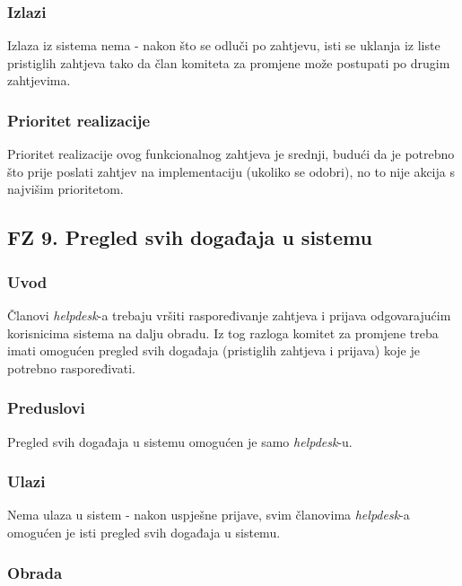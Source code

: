 \documentclass[12pt,a4paper]{article}
\begin{document}
\subsubsection{Izlazi}

Izlaza iz sistema nema - nakon što se odluči po zahtjevu, isti se uklanja iz liste pristiglih zahtjeva tako da član komiteta za promjene može postupati po drugim zahtjevima.

\subsubsection{Prioritet realizacije}

Prioritet realizacije ovog funkcionalnog zahtjeva je srednji, budući da je potrebno što prije poslati zahtjev na implementaciju (ukoliko se odobri), no to nije akcija s najvišim prioritetom.

\newpage

\subsection{FZ 9. Pregled svih događaja u sistemu}

\subsubsection{Uvod}

Članovi \textit{helpdesk}-a trebaju vršiti raspoređivanje zahtjeva i prijava odgovarajućim korisnicima sistema na dalju obradu. Iz tog razloga komitet za promjene treba imati omogućen pregled svih događaja (pristiglih zahtjeva i prijava) koje je potrebno raspoređivati.

\subsubsection{Preduslovi}

Pregled svih događaja u sistemu omogućen je samo \textit{helpdesk}-u.

\subsubsection{Ulazi}

Nema ulaza u sistem - nakon uspješne prijave, svim članovima \textit{helpdesk}-a omogućen je isti pregled svih događaja u sistemu.

\subsubsection{Obrada}
\end{document}
